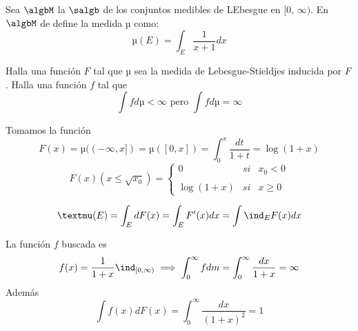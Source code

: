 \begin{problem}[12]
Sea $\algbM$ la $\salgb$ de los conjuntos medibles de LEbesgue en [0, $\infty)$. En $\algbM$ de define la medida µ como:
\[µ(E) = \int_E \frac{1}{x+1} dx\]

Halla una función $F$ tal que µ sea la medida de Lebesgue-Stieldjes inducida por $F$. Halla una función $f$ tal que
\[\int f dµ < \infty \text{ pero } \int f dµ = \infty\]

\solution

Tomamos la función
\[F(x) = µ((-\infty, x]) = µ([0,x]) = \int_0^x \frac{dt}{1+t}=\log (1+x)\]
\[
F(x) (x \leq \sqrt{x_0})= \left\{ \begin{array}{lcc}
             0 & si & x_0 < 0 \\
             \\ \log(1+x) &  si & x \geq 0
             \end{array}
   \right.
\]

\obs \[µ(E) = \int_E dF(x) = \int_E F'(x) dx = \int \ind_E F(x) dx\]

La función $f$ buscada es
\[f(x) = \frac{1}{1+x}\ind_{[0, \infty)} \implies \int_0^{\infty} f dm = \int_0^{\infty} \frac{dx}{1+x} = \infty\]
Además
\[\int f(x) dF(x) = \int_0^{\infty} \frac{dx}{(1+x)^2} = 1\]

\end{problem}


